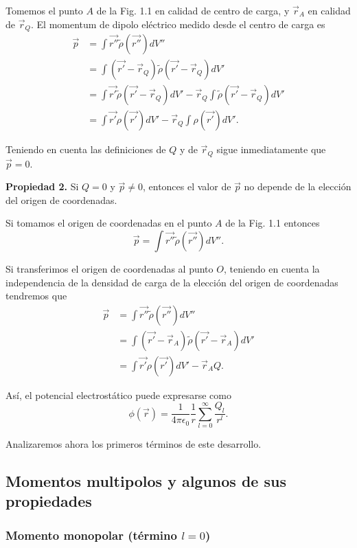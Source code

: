 \documentclass[12pt,a4paper]{book}
\begin{document}
Tomemos el punto $A$ de la Fig. 1.1 en calidad de centro de carga, y $\vec{r}_A$ en calidad de $\vec{r}_Q$. El momentum de dipolo eléctrico medido desde el centro de carga es
\begin{align}
\vec{p} &= \int\vec{r''}\tilde{\rho}(\vec{r''})dV'' \\
&= \int(\vec{r'} - \vec{r}_Q)\tilde{\rho}(\vec{r'} - \vec{r}_Q)dV' \\
&= \int\vec{r'}\tilde{\rho}(\vec{r'} - \vec{r}_Q)dV' - \vec{r}_Q\int\tilde{\rho}(\vec{r'} - \vec{r}_Q)dV' \\
&= \int\vec{r'}\rho(\vec{r'})dV' - \vec{r}_Q\int\rho(\vec{r'})dV'.
\end{align}

Teniendo en cuenta las definiciones de $Q$ y de $\vec{r}_Q$ sigue inmediatamente que $\vec{p} = 0$.

\textbf{Propiedad 2.} Si $Q = 0$ y $\vec{p} \neq 0$, entonces el valor de $\vec{p}$ no depende de la elección del origen de coordenadas.

Si tomamos el origen de coordenadas en el punto $A$ de la Fig. 1.1 entonces
\begin{equation}
\vec{p} = \int\vec{r''}\tilde{\rho}(\vec{r''})dV''.
\end{equation}

Si transferimos el origen de coordenadas al punto $O$, teniendo en cuenta la independencia de la densidad de carga de la elección del origen de coordenadas tendremos que
\begin{align}
\vec{p} &= \int\vec{r''}\tilde{\rho}(\vec{r''})dV'' \\
&= \int(\vec{r'} - \vec{r}_A)\tilde{\rho}(\vec{r'} - \vec{r}_A)dV' \\
&= \int\vec{r'}\rho(\vec{r'})dV' - \vec{r}_A Q.
\end{align}

Así, el potencial electrostático puede expresarse como
\begin{equation}
\phi(\vec{r}) = \frac{1}{4\pi\epsilon_0}\frac{1}{r}\sum_{l=0}^{\infty}\frac{Q_l}{r^l}.
\end{equation}

Analizaremos ahora los primeros términos de este desarrollo.

\subsection{Momentos multipolos y algunos de sus propiedades}

\subsubsection{Momento monopolar (término $l=0$)}
\end{document}
